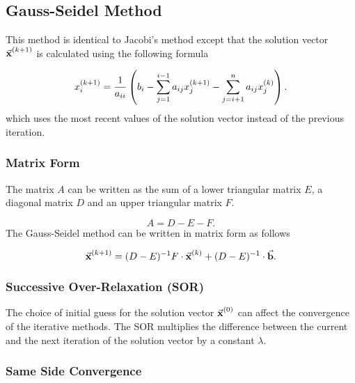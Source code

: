 \documentclass{report}
\begin{document}

\subsection{Gauss-Seidel Method}

This method is identical to Jacobi's method except that the solution vector $\vec{\bm{\mathrm{x}}}^{(k+1)}$ is calculated using the following formula

\[
	x_i^{(k+1)} = \frac{1}{a_{ii}}\left(b_i - \sum_{j=1}^{i-1}a_{ij}x_j^{(k+1)} - \sum_{j=i+1}^{n}a_{ij}x_j^{(k)}\right)
	.\]
which uses the most recent values of the solution vector instead of the previous iteration.

\subsubsection{Matrix Form}

The matrix $A$ can be written as the sum of a lower triangular matrix $E$, a diagonal matrix $D$ and an upper triangular matrix $F$.

\[
	A = D - E - F
	.\]
The Gauss-Seidel method can be written in matrix form as follows

\[
	\vec{\bm{\mathrm{x}}}^{(k+1)} = (D-E)^{-1}F\cdot\vec{\bm{\mathrm{x}}}^{(k)} + (D-E)^{-1}\cdot\vec{\bm{\mathrm{b}}}
	.\]



\subsubsection{Successive Over-Relaxation (SOR)}

The choice of initial guess for the solution vector $\vec{\bm{\mathrm{x}}}^{(0)}$ can affect the convergence of the iterative methods. The SOR multiplies the difference between the current and the next iteration of the solution vector by a constant $\lambda$.

\subsubsection{Same Side Convergence}
\end{document}
